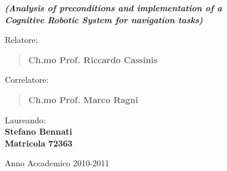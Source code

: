 \begin{titlepage}
\begin{center}

\vspace{0.5cm}

{\small \emph{\textbf{(Analysis of preconditions and implementation of a \\ Cognitive Robotic System for navigation tasks)}}} \\

\vspace{1.5cm}

\begin{flushleft}

{\normalsize Relatore:}
\begin{quote}
{\large \textbf{Ch.mo Prof. Riccardo Cassinis}} \\
\vspace{0.2cm}
\end{quote}

{\normalsize Correlatore:}
\begin{quote}
{\large \textbf{Ch.mo Prof. Marco Ragni}} \\
\vspace{0.2cm}
\end{quote}

\end{flushleft}


\begin{flushright}
Laureando: \\
\textbf{Stefano Bennati} \\
\vspace{0.05cm}
\textbf{Matricola 72363} \\
\vspace{1.5cm}
\end{flushright}

\large{Anno Accademico 2010-2011}

\end{center}
\end{titlepage}